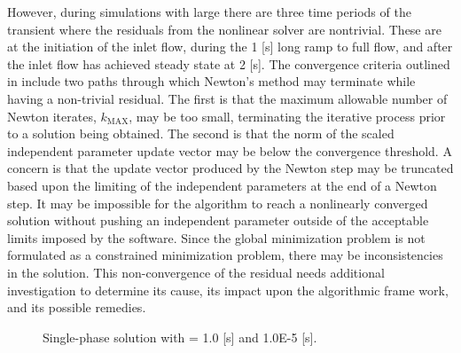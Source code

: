However, during simulations with large \dtmax{} there are three time periods of the transient where the residuals from the nonlinear solver are nontrivial.
These are at the initiation of the inlet flow, during the 1 [s] long ramp to full flow, and after the inlet flow has achieved steady state at 2 [s].
The convergence criteria outlined in  include two paths through which Newton's method may terminate while having a non-trivial residual.
The first is that the maximum allowable number of Newton iterates, $k_{\text{MAX}}$, may be too small, terminating the iterative process prior to a solution being obtained.
The second is that the norm of the scaled independent parameter update vector may be below the convergence threshold.
A concern is that the update vector produced by the Newton step may be truncated based upon the limiting of the independent parameters at the end of a Newton step.
It may be impossible for the algorithm to reach a nonlinearly converged solution without pushing an independent parameter outside of the acceptable limits imposed by the software.
Since the global minimization problem is not formulated as a constrained minimization problem, there may be inconsistencies in the solution.
This non-convergence of the residual needs additional investigation to determine its cause, its impact upon the algorithmic frame work, and its possible remedies.

\begin{figure}[h!t]
\centering
{}
\caption[Single-phase solution at \dtmax{} = 1.0 {[s]}and 1.0E-5 {[s]}]{Single-phase solution with \dtmax{} = 1.0 {[s]} and 1.0E-5 {[s]}.}
\label{fig:single_compare_1}
\end{figure}


